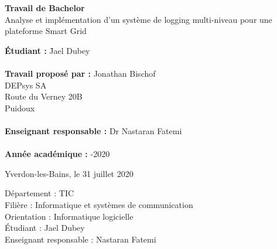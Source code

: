\documentclass[paper=a4, fontsize=11pt]{scrartcl}
\begin{document}

\begin{titlepage}
  \thispagestyle{firstpage}
  \begin{center}
    \vspace*{5cm}
    
    \Huge
    \textbf{Travail de Bachelor}
    \large
    \\

    \vspace{1.2cm}
    \LARGE
    Analyse et implémentation d'un système de logging multi-niveau pour une plateforme Smart Grid
  \end{center}

  \vspace{6cm}
  \begin{tabbing}
    \linespread{3}\textbf{Étudiant :} \hspace{12em} \= Jael Dubey\\\\

    \textbf{Travail proposé par :} \> Jonathan Bischof\\
    \> DEPsys SA\\
    \> Route du Verney 20B\\
     Puidoux\\\\

    \textbf{Enseignant responsable :} \> Dr Nastaran Fatemi\\\\

    \textbf{Année académique :} -2020
  \end{tabbing}

  \vspace{3cm}
  \begin{flushright}
    Yverdon-les-Bains, le 31 juillet 2020
  \end{flushright}
\end{titlepage}

\newpage
{}

\begin{flushright}
      Département : TIC\\
      Filière : Informatique et systèmes de communication\\
      Orientation : Informatique logicielle\\
      Étudiant : Jael Dubey\\
      Enseignant responsable : Nastaran Fatemi\\
  \end{flushright}
  
\end{document}
